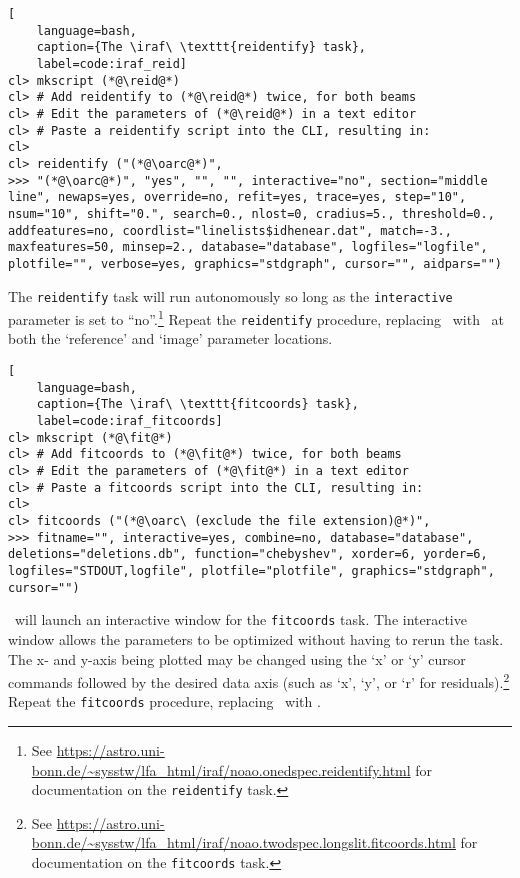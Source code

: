 \begin{lstlisting}[
    language=bash,
    caption={The \iraf\ \texttt{reidentify} task},
    label=code:iraf_reid]
cl> mkscript (*@\reid@*)
cl> # Add reidentify to (*@\reid@*) twice, for both beams
cl> # Edit the parameters of (*@\reid@*) in a text editor
cl> # Paste a reidentify script into the CLI, resulting in:
cl> 
cl> reidentify ("(*@\oarc@*)",
>>> "(*@\oarc@*)", "yes", "", "", interactive="no", section="middle line", newaps=yes, override=no, refit=yes, trace=yes, step="10", nsum="10", shift="0.", search=0., nlost=0, cradius=5., threshold=0., addfeatures=no, coordlist="linelists$idhenear.dat", match=-3., maxfeatures=50, minsep=2., database="database", logfiles="logfile", plotfile="", verbose=yes, graphics="stdgraph", cursor="", aidpars="")
\end{lstlisting}

The \texttt{reidentify} task will run autonomously so long as the \texttt{interactive} parameter is set to ``no''.\footnote{See \protect\url{https://astro.uni-bonn.de/~sysstw/lfa_html/iraf/noao.onedspec.reidentify.html} for documentation on the \texttt{reidentify} task.} Repeat the \texttt{reidentify} procedure, replacing \oarc\ with \earc\ at both the `reference' and `image' parameter locations.

\begin{lstlisting}[
    language=bash,
    caption={The \iraf\ \texttt{fitcoords} task},
    label=code:iraf_fitcoords]
cl> mkscript (*@\fit@*)
cl> # Add fitcoords to (*@\fit@*) twice, for both beams
cl> # Edit the parameters of (*@\fit@*) in a text editor
cl> # Paste a fitcoords script into the CLI, resulting in:
cl> 
cl> fitcoords ("(*@\oarc\ (exclude the file extension)@*)",
>>> fitname="", interactive=yes, combine=no, database="database", deletions="deletions.db", function="chebyshev", xorder=6, yorder=6, logfiles="STDOUT,logfile", plotfile="plotfile", graphics="stdgraph", cursor="")
\end{lstlisting}

\iraf\ will launch an interactive window for the \texttt{fitcoords} task. The interactive window allows the parameters to be optimized without having to rerun the task. The x- and y-axis being plotted may be changed using the `x' or `y' cursor commands followed by the desired data axis (such as `x', `y', or `r' for residuals).\footnote{See \protect\url{https://astro.uni-bonn.de/~sysstw/lfa_html/iraf/noao.twodspec.longslit.fitcoords.html} for documentation on the \texttt{fitcoords} task.} Repeat the \texttt{fitcoords} procedure, replacing \oarc\ with \earc.

